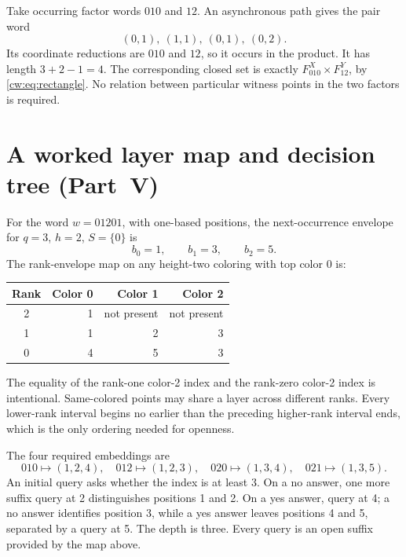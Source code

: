\documentclass[11pt,letterpaper]{article}
\numberwithin{equation}{section}
\theoremstyle{definition}
\theoremstyle{remark}
\theoremstyle{definition}
\begin{document}
Take occurring factor words $010$ and $12$. An asynchronous path gives the
pair word
\[
 (0,1),\ (1,1),\ (0,1),\ (0,2).
\]
Its coordinate reductions are $010$ and $12$, so it occurs in the product.
It has length $3+2-1=4$. The corresponding closed set is exactly
$F^X_{010}\times F^Y_{12}$, by \eqref{cw:eq:rectangle}. No relation between
particular witness points in the two factors is required.

\section{A worked layer map and decision tree (Part~V)}\label{uw:app:worked}
For the word $w=01201$, with one-based positions, the next-occurrence envelope
for $q=3$, $h=2$, $S=\{0\}$ is
\[
 b_0=1,\qquad b_1=3,\qquad b_2=5.
\]
The rank-envelope map on any height-two coloring with top color $0$ is:
\begin{center}
\begin{tabular}{@{}crrr@{}}
\toprule
Rank & Color 0 & Color 1 & Color 2\\
\midrule
2 & 1 & not present & not present\\
1 & 1 & 2 & 3\\
0 & 4 & 5 & 3\\
\bottomrule
\end{tabular}
\end{center}
The equality of the rank-one color-2 index and the rank-zero color-2 index
is intentional. Same-colored points may share a layer across different ranks.
Every lower-rank interval begins no earlier than the preceding higher-rank
interval ends, which is the only ordering needed for openness.

The four required embeddings are
\[
 010\mapsto(1,2,4),\quad012\mapsto(1,2,3),\quad
 020\mapsto(1,3,4),\quad021\mapsto(1,3,5).
\]
An initial query asks whether the index is at least 3. On a no answer, one
more suffix query at 2 distinguishes positions 1 and 2. On a yes answer,
query at 4; a no answer identifies position 3, while a yes answer leaves
positions 4 and 5, separated by a query at 5. The depth is three. Every query
is an open suffix provided by the map above.
\end{document}
